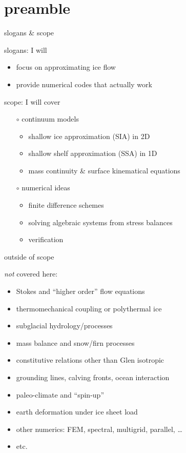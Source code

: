 
\section{preamble}

\begin{frame}{slogans \& scope}

slogans: I will
  \begin{itemize}
  \item \alert{focus on approximating ice flow}
  \item \alert{provide numerical codes that actually work}
  \end{itemize}
\medskip

scope: I will cover
  \begin{itemize}
  \item[$\circ$] continuum models

    \begin{itemize}
    \item shallow ice approximation (SIA) in 2D
    \item shallow shelf approximation (SSA) in 1D
    \item mass continuity \& surface kinematical equations
    \end{itemize}

  \item[$\circ$] numerical ideas

    \begin{itemize}
    \item finite difference schemes
    \item solving algebraic systems from stress balances
    \item verification
    \end{itemize}
  \end{itemize}
\end{frame}


\begin{frame}{outside of scope}

\large\emph{not} \normalsize covered here:\normalsize
\medskip

  \begin{itemize}
  \item Stokes and ``higher order'' flow equations
  \item thermomechanical coupling or polythermal ice
  \item subglacial hydrology/processes
  \item mass balance and snow/firn processes
  \item constitutive relations other than Glen isotropic
  \item grounding lines, calving fronts, ocean interaction
  \item paleo-climate and ``spin-up''
  \item earth deformation under ice sheet load
  \item other numerics: FEM, spectral, multigrid, parallel, \dots
  \item etc.
  \end{itemize}

\end{frame}


